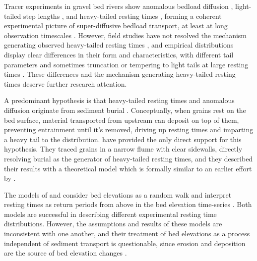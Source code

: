 \documentclass[draft]{agujournal2018}
\begin{document}
Tracer experiments in gravel bed rivers show anomalous bedload diffusion \citep{Phillips2013, Bradley2017}, light-tailed step lengths \citep{Bradley2012, Hassan2013}, and heavy-tailed resting times \citep{Voepel2013, Olinde2015, Pretzlav2016, Bradley2017}, forming a coherent experimental picture of super-diffusive bedload transport, at least at long observation timescales \citep[e.g.][]{Nikora2002, Martin2012}.
However, field studies have not resolved the mechanism generating observed heavy-tailed resting times \citep[e.g.][]{Bradley2017}, and empirical distributions display clear differences in their form and characteristics, with different tail parameters \citep[e.g.][]{Olinde2015} and sometimes truncation \citep[e.g.][]{Bradley2017} or tempering to light tails at large resting times \citep[e.g.][]{Voepel2013}.
These differences and the mechanism generating heavy-tailed resting times deserve further research attention.

A predominant hypothesis is that heavy-tailed resting times and anomalous diffusion originate from sediment burial \citep{Voepel2013,Martin2014,Wu2019}.
Conceptually, when grains rest on the bed surface, material transported from upstream can deposit on top of them, preventing entrainment until it's removed, driving up resting times and imparting a heavy tail to the distribution.
\citet{Martin2014} have provided the only direct support for this hypothesis.
They traced grains in a narrow flume with clear sidewalls, directly resolving burial as the generator of heavy-tailed resting times, and they described their results with a theoretical model which is formally similar to an earlier effort by \citet{Voepel2013}.

The models of \citet{Voepel2013} and \citet{Martin2014} consider bed elevations as a random walk and interpret resting times as return periods from above in the bed elevation time-series \citep[e.g.][]{Redner2007}.
Both models are successful in describing different experimental resting time distributions.
However, the assumptions and results of these models are inconsistent with one another, and their treatment of bed elevations as a process independent of sediment transport is questionable, since erosion and deposition are the source of bed elevation changes \citep[e.g.][]{Wong2007}.
\end{document}
